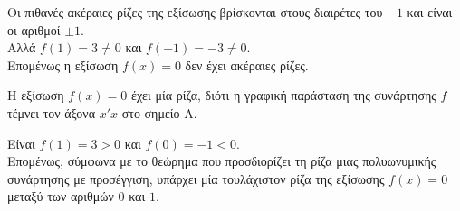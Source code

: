 \begin{alist}
\item Οι πιθανές ακέραιες ρίζες της εξίσωσης βρίσκονται στους διαιρέτες του $-1$ και είναι οι αριθμοί $\pm 1$. \\
Αλλά $f(1) = 3 \ne 0$ και $f(-1) = -3 \ne 0$. \\
Επομένως η εξίσωση $f(x) = 0$ δεν έχει ακέραιες ρίζες.
\item 
\begin{rlist}
\item Η εξίσωση $f(x) = 0$ έχει μία ρίζα, διότι η γραφική παράσταση της συνάρτησης $f$ τέμνει τον άξονα $x'x$ στο σημείο $\text{A}$.
\item Είναι $f(1) = 3 > 0$ και $f(0) = -1 < 0$. \\
Επομένως, σύμφωνα με το θεώρημα που προσδιορίζει τη ρίζα μιας πολυωνυμικής συνάρτησης με προσέγγιση, υπάρχει μία τουλάχιστον ρίζα της εξίσωσης $f(x) = 0$ μεταξύ των αριθμών $0$ και $1$.
\end{rlist}
\end{alist}


